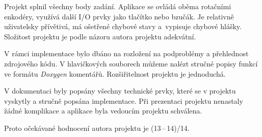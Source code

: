 \documentclass[a4paper, 11pt]{article}
\begin{document}
Projekt splnil všechny body zadání. 
Aplikace se ovládá oběma rotačními enkodéry, využívá další I/O prvky jako tlačítko nebo bzučák.
Je relativně uživatelsky přívětivá, má ošetřené chybové stavy a~vypisuje chybové hlášky.
Složitost projektu je podle názoru autora projektu adekvátní.

V rámci implementace bylo dbáno na rozložení na podproblémy a přehlednost zdrojového kódu.
V hlavičkových souborech můžeme nalézt stručné popisy funkcí ve formátu \emph{Doxygen} komentářů.
Rozšiřitelnost projektu je jednoduchá.

V dokumentaci byly popsány všechny technické prvky, které se v projektu vyskytly a stručně popsána implementace.
Při prezentaci projektu nenastaly žádné komplikace a aplikace byla vedoucím projektu schválena.

Proto očekávané hodnocení autora projektu je (13\,--\,14)/14.
\end{document}

